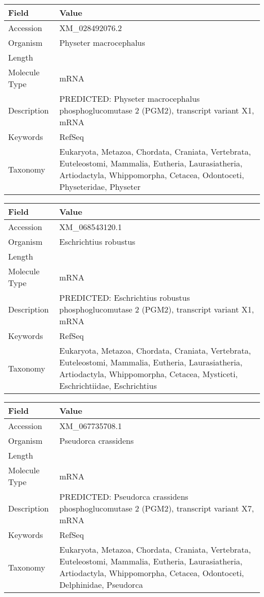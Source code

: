 \documentclass[10pt]{article}
\begin{document}
\vspace{1em}
{\footnotesize
\begin{longtable}{>{\raggedright\arraybackslash}p{4.5cm} >{\raggedright\arraybackslash}p{11.5cm}}
\textbf{Field} & \textbf{Value} \\
\hline
Accession & XM\_028492076.2 \\
Organism & Physeter macrocephalus \\
Length & 2077 \\
Molecule Type & mRNA \\
Description & PREDICTED: Physeter macrocephalus phosphoglucomutase 2 (PGM2), transcript variant X1, mRNA \\
Keywords & RefSeq \\
Taxonomy & Eukaryota, Metazoa, Chordata, Craniata, Vertebrata, Euteleostomi, Mammalia, Eutheria, Laurasiatheria, Artiodactyla, Whippomorpha, Cetacea, Odontoceti, Physeteridae, Physeter \\
\end{longtable}
}

\vspace{1em}
{\footnotesize
\begin{longtable}{>{\raggedright\arraybackslash}p{4.5cm} >{\raggedright\arraybackslash}p{11.5cm}}
\textbf{Field} & \textbf{Value} \\
\hline
Accession & XM\_068543120.1 \\
Organism & Eschrichtius robustus \\
Length & 4200 \\
Molecule Type & mRNA \\
Description & PREDICTED: Eschrichtius robustus phosphoglucomutase 2 (PGM2), transcript variant X1, mRNA \\
Keywords & RefSeq \\
Taxonomy & Eukaryota, Metazoa, Chordata, Craniata, Vertebrata, Euteleostomi, Mammalia, Eutheria, Laurasiatheria, Artiodactyla, Whippomorpha, Cetacea, Mysticeti, Eschrichtiidae, Eschrichtius \\
\end{longtable}
}

\vspace{1em}
{\footnotesize
\begin{longtable}{>{\raggedright\arraybackslash}p{4.5cm} >{\raggedright\arraybackslash}p{11.5cm}}
\textbf{Field} & \textbf{Value} \\
\hline
Accession & XM\_067735708.1 \\
Organism & Pseudorca crassidens \\
Length & 12448 \\
Molecule Type & mRNA \\
Description & PREDICTED: Pseudorca crassidens phosphoglucomutase 2 (PGM2), transcript variant X7, mRNA \\
Keywords & RefSeq \\
Taxonomy & Eukaryota, Metazoa, Chordata, Craniata, Vertebrata, Euteleostomi, Mammalia, Eutheria, Laurasiatheria, Artiodactyla, Whippomorpha, Cetacea, Odontoceti, Delphinidae, Pseudorca \\
\end{longtable}
}
\end{document}
